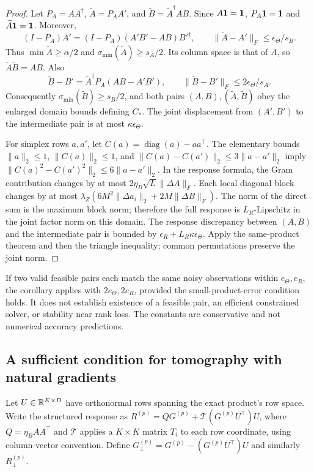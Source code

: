 \begin{proof}
Let $P_A=AA^\dagger$, $\widetilde A=P_AA'$, and
$\widetilde B=\widetilde A^\dagger AB$. Since $A\mathbf{1}=\mathbf{1}$,
$P_A\mathbf{1}=\mathbf{1}$ and $\widetilde A\mathbf{1}=\mathbf{1}$. Moreover,
\[
 (I-P_A)A'=(I-P_A)(A'B'-AB)B'^\dagger,
 \qquad \|\widetilde A-A'\|_F\le\epsilon_\Theta/s_B.
\]
Thus $\min\widetilde A\ge\alpha/2$ and
$\sigma_{\min}(\widetilde A)\ge s_A/2$. Its column space is that of $A$, so
$\widetilde A\widetilde B=AB$. Also
\[
 \widetilde B-B'=\widetilde A^\dagger P_A(AB-A'B'),\qquad
 \|\widetilde B-B'\|_F\le2\epsilon_\Theta/s_A.
\]
Consequently $\sigma_{\min}(\widetilde B)\ge s_B/2$, and both pairs
$(A,B),(\widetilde A,\widetilde B)$ obey the enlarged domain bounds defining
$C_*$. The joint displacement from $(A',B')$ to the intermediate pair is at
most $\kappa\epsilon_\Theta$.

For simplex rows $a,a'$, let $C(a)=\operatorname{diag}(a)-aa^\top$.
The elementary bounds $\|a\|_2\le1$, $\|C(a)\|_2\le1$, and
$\|C(a)-C(a')\|_2\le3\|a-a'\|_2$ imply
$\|C(a)^2-C(a')^2\|_2\le6\|a-a'\|_2$.
In the response formula, the Gram contribution changes by at most
$2\eta_B\sqrt L\|\Delta A\|_F$. Each local diagonal block changes by at most
$\lambda_Z(6M^2\|\Delta a_i\|_2+2M\|\Delta B\|_F)$.
The norm of the direct sum is the maximum block norm; therefore the full
response is $L_R$-Lipschitz in the joint factor norm on this domain.
The response discrepancy between $(A,B)$ and the intermediate pair is bounded
by $\epsilon_R+L_R\kappa\epsilon_\Theta$. Apply the same-product theorem and
then the triangle inequality; common permutations preserve the joint norm.
\end{proof}

If two valid feasible pairs each match the same noisy observations within
$e_\Theta,e_R$, the corollary applies with $2e_\Theta,2e_R$, provided the
small-product-error condition holds. It does not establish existence of a
feasible pair, an efficient constrained solver, or stability near rank loss.
The constants are conservative and not numerical accuracy predictions.

\subsection{A sufficient condition for tomography with natural gradients}
\label{app:natural-tomography}

Let $U\in\mathbb{R}^{K\times D}$ have orthonormal rows spanning the exact product's
row space. Write the structured response as
$R^{(p)}=QG^{(p)}+\mathcal T(G^{(p)}U^\top)U$, where
$Q=\eta_B AA^\top$ and $\mathcal T$ applies a $K\times K$ matrix $T_i$ to each
row coordinate, using column-vector convention. Define
$G_\perp^{(p)}=G^{(p)}-(G^{(p)}U^\top)U$ and similarly $R_\perp^{(p)}$.


